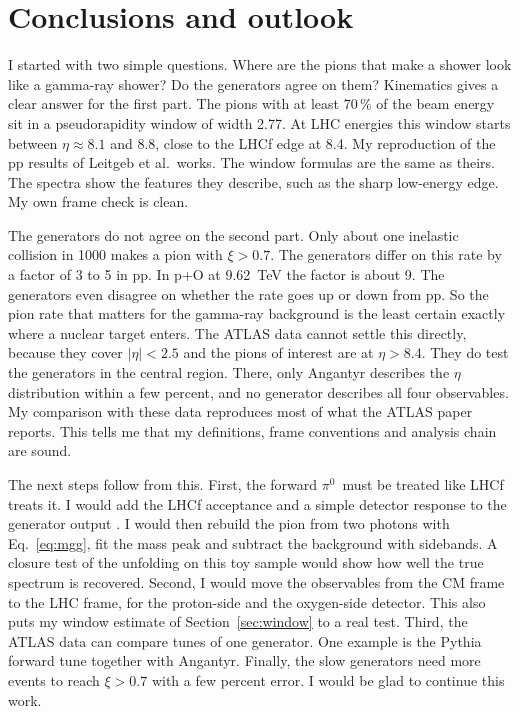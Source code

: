 \documentclass[11pt,a4paper]{article}
\newcommand{\pizero}{\ensuremath{\pi^{0}}}
\begin{document}
\section{Conclusions and outlook}
I started with two simple questions.
Where are the pions that make a shower look like a gamma-ray shower?
Do the generators agree on them?
Kinematics gives a clear answer for the first part.
The pions with at least 70\,\% of the beam energy sit in a pseudorapidity window of width 2.77.
At LHC energies this window starts between $\eta\approx8.1$ and 8.8, close to the LHCf edge at 8.4.
My reproduction of the pp results of Leitgeb et al.\ works.
The window formulas are the same as theirs.
The spectra show the features they describe, such as the sharp low-energy edge.
My own frame check is clean.

The generators do not agree on the second part.
Only about one inelastic collision in 1000 makes a pion with $\xi>0.7$.
The generators differ on this rate by a factor of 3 to 5 in pp.
In p+O at 9.62~TeV the factor is about 9.
The generators even disagree on whether the rate goes up or down from pp.
So the pion rate that matters for the gamma-ray background is the least certain exactly where a nuclear target enters.
The ATLAS data cannot settle this directly, because they cover $|\eta|<2.5$ and the pions of interest are at $\eta>8.4$.
They do test the generators in the central region.
There, only Angantyr describes the $\eta$ distribution within a few percent, and no generator describes all four observables.
My comparison with these data reproduces most of what the ATLAS paper reports.
This tells me that my definitions, frame conventions and analysis chain are sound.

The next steps follow from this.
First, the forward \pizero\ must be treated like LHCf treats it.
I would add the LHCf acceptance and a simple detector response to the generator output \cite{LHCf:2012pi0}.
I would then rebuild the pion from two photons with Eq.~\eqref{eq:mgg}, fit the mass peak and subtract the background with sidebands.
A closure test of the unfolding on this toy sample would show how well the true spectrum is recovered.
Second, I would move the observables from the CM frame to the LHC frame, for the proton-side and the oxygen-side detector.
This also puts my window estimate of Section~\ref{sec:window} to a real test.
Third, the ATLAS data can compare tunes of one generator.
One example is the Pythia forward tune \cite{Fieg:2024tune} together with Angantyr.
Finally, the slow generators need more events to reach $\xi>0.7$ with a few percent error.
I would be glad to continue this work.
\end{document}
